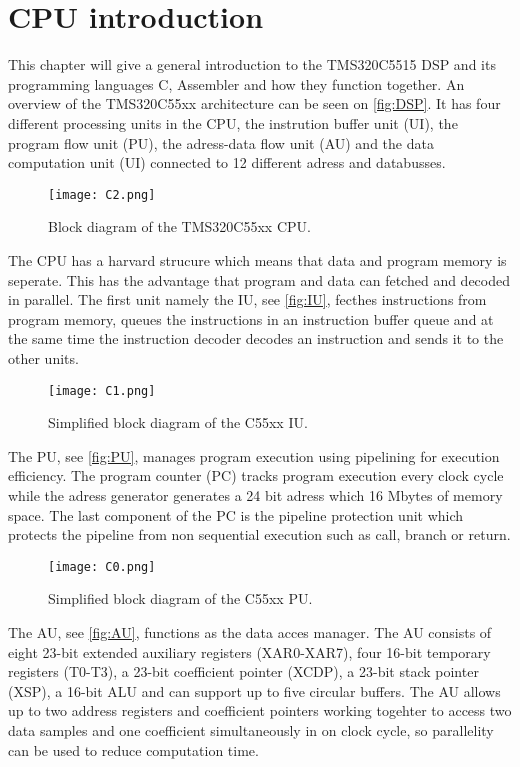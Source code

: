 \chapter{CPU introduction}
This chapter will give a general introduction to the TMS320C5515 DSP and its programming languages C, Assembler and how they function together. An overview of the TMS320C55xx architecture can be seen on \autoref{fig:DSP}. It has four different processing units in the CPU, the instrution buffer unit (UI), the program flow unit (PU), the adress-data flow unit (AU) and the data computation unit (UI) connected to 12 different adress and databusses.  
\begin{figure}[H]
\centering
\texttt{[image: C2.png]}
\label{fig:DSP}
\caption{Block diagram of the TMS320C55xx CPU.}
\end{figure}
The CPU has a harvard strucure which means that data and program memory is seperate. This has the advantage that program and data can fetched and decoded in parallel. The first unit namely the IU, see \autoref{fig:IU}, fecthes instructions from program memory, queues the instructions in an instruction buffer queue and at the same time the instruction decoder decodes an instruction and sends it to the other units.
\begin{figure}[H]
\centering
\texttt{[image: C1.png]}
\label{fig:IU}
\caption{Simplified block diagram of the C55xx IU.}
\end{figure}
The PU, see \autoref{fig:PU}, manages program execution using pipelining for execution efficiency. The program counter (PC) tracks program execution every clock cycle while the adress generator generates a 24 bit adress which 16 Mbytes of memory space. The last component of the PC is the pipeline protection unit which protects the pipeline from non sequential execution such as call, branch or return.
\begin{figure}[H]
\centering
\texttt{[image: C0.png]}
\label{fig:PU}
\caption{Simplified block diagram of the C55xx PU.}
\end{figure}
The AU, see \autoref{fig:AU}, functions as the data acces manager. The AU consists of eight 23-bit extended auxiliary registers (XAR0-XAR7), four 16-bit temporary registers (T0-T3), a 23-bit coefficient pointer (XCDP), a 23-bit stack pointer (XSP), a 16-bit ALU and can support up to five circular buffers. The AU allows up to two address registers and coefficient pointers working togehter to access two data samples and one coefficient simultaneously in on clock cycle, so parallelity can be used to reduce computation time. 
